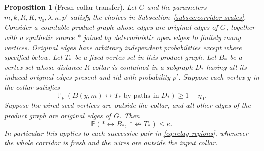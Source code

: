 \documentclass[11pt]{article}
\newtheorem{proposition}[theorem]{Proposition}
\theoremstyle{definition}
\newcommand{\PP}{\mathbb P}
\begin{document}
\begin{proposition}[Fresh-collar transfer]\label{prop:transfer}
Let $G$ and the parameters $m,k,R,K,\eta_0,\lambda,\kappa,p'$ satisfy
the choices in Subsection~\ref{subsec:corridor-scales}. Consider a
countable product graph whose edges are original edges of $G$,
together with a synthetic source $*$ joined by deterministic open
edges to finitely many vertices. Original edges have arbitrary
independent probabilities except where specified below.
Let $T_*$ be a fixed vertex set in this product graph.
Let $B_*$ be a vertex set whose distance-$R$ collar is contained in a
subgraph $D_*$ having all its induced original edges present and iid
with probability $p'$. Suppose each vertex $y$ in the collar satisfies
\[
 \PP_{p'}(B(y,m)\leftrightarrow T_*\text{ by paths in }D_*)
       \ge1-\eta_0.
\]
Suppose the wired seed vertices are outside the collar, and all other
edges of the product graph are original edges of $G$. Then
\begin{equation}\label{eq:fresh-collar-transfer}
 \PP(*\leftrightarrow B_*,\ *\nleftrightarrow T_*)\le\kappa.
\end{equation}
In particular this applies to each successive pair in
\eqref{eq:relay-regions}, whenever the whole corridor is fresh and
the wires are outside the input collar.
\end{proposition}
\end{document}

